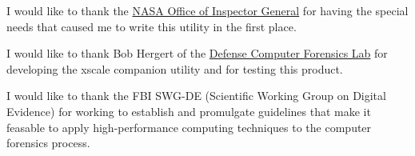 \documentclass[letterpaper]{article}
\begin{document}
I would like to thank the \ifpdf
\href{www.hq.nasa.gov/office/oig/}{NASA Office of Inspector General}%
\else
{}%
\fi{}
 for having the special
needs that caused me to write this utility in the first place.



I would like to thank Bob Hergert of the \ifpdf
\href{www.dcfl.gov}{Defense Computer Forensics Lab}%
\else
{}%
\fi{}
 for developing the
{\ttfamily xscale} companion utility and for testing this product.



I would like to thank the FBI SWG-DE (Scientific Working Group on
Digital Evidence) for working to establish and promulgate guidelines
that make it feasable to apply high-performance computing techniques
to the computer forensics process.
\end{document}
